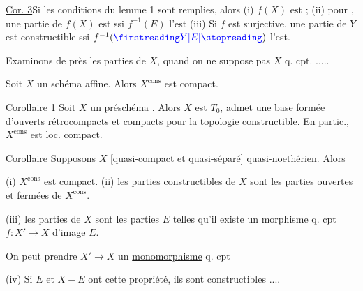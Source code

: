 \uline{Cor. 3}\quad Si les conditions du lemme 1 sont remplies, alors (i) $f(X)$ est ; (ii) pour , une partie  de $f(X)$ est  ssi $f^{-1}(E)$ l'est (iii) Si $f$ est surjective, une partie de $Y$ est constructible ssi $f^{-1}(\unsure{Y|E})$ l'est.


Examinons  de près les parties   de $X$, quand on ne suppose pas $X$ q. cpt. .....


\uline{} Soit $X$ un schéma affine. Alors $X^{\mathrm{cons}}$ est compact.

\uline{Corollaire 1} Soit $X$ un préschéma  . Alors $X$ est $T_0$, admet une base formée d'ouverts rétrocompacts et compacts pour la topologie constructible. En partic., $X^{\mathrm{cons}}$ est loc. compact.

\uline{Corollaire } Supposons  $X$ [quasi-compact et quasi-séparé]  quasi-noethérien. Alors

(i) $X^{\mathrm{cons}}$ est compact. (ii) les parties constructibles de $X$ sont les parties ouvertes et fermées de $X^{\mathrm{cons}}$.

(iii) les parties   de $X$ sont les parties $E$ telles qu'il existe un morphisme q. cpt $f:X'\longrightarrow X$ d'image $E$.

On peut prendre   $X'\longrightarrow X$ un \uline{monomorphisme} q. cpt 

\deleted{[NB. \unsure{admet}} (iv) Si $E$ et $X-E$ ont cette propriété, ils sont constructibles ....



